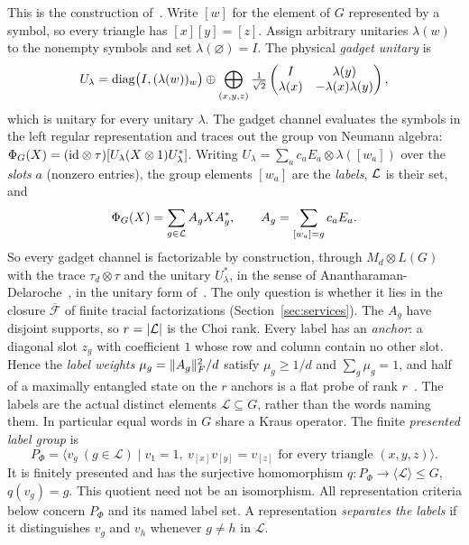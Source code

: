 This is the construction of~\cite[Section~9]{DouglasMghirbiC}.
Write $[w]$ for the element of $G$ represented by a symbol, so every
triangle has $[x][y]=[z]$. Assign arbitrary unitaries $\lambda(w)$
to the nonempty symbols and set $\lambda(\varnothing)=I$.
The physical \emph{gadget unitary} is
\begin{equation}\label{eq:canonical-unitary}
U_\lambda=\operatorname{diag}\bigl(I,(\lambda(w))_w\bigr)\oplus\bigoplus_{(x,y,z)}\tfrac1{\sqrt2}\begin{pmatrix}I&\lambda(y)\\\lambda(x)&-\lambda(x)\lambda(y)\end{pmatrix},
\end{equation}
which is unitary for every unitary $\lambda$. The gadget channel evaluates the symbols in the left regular representation and traces out the
group von Neumann algebra: $\Phi_G(X)=(\mathrm{id}\otimes\tau)[U_\lambda(X\otimes1)U_\lambda^*]$. Writing $U_\lambda=\sum_ac_aE_a\otimes\lambda([w_a])$ over the
\emph{slots} $a$ (nonzero entries), the group elements $[w_a]$ are the \emph{labels}, $\mathcal L$ is their set, and
\[
\Phi_G(X)=\sum_{g\in\mathcal L}A_gXA_g^*,\qquad A_g=\sum_{[w_a]=g}c_aE_a .
\]
So every gadget channel is factorizable by construction, through
$M_d\otimes L(G)$ with the trace $\tau_d\otimes\tau$ and the unitary
$U_\lambda^*$, in the sense of
Anantharaman-Delaroche~\cite{AnantharamanDelaroche2006}, in the unitary
form of~\cite[Theorem~2.2]{HaagerupMusat2011}.
The only question is whether it lies in the closure
$\overline{\mathcal F}$ of finite tracial factorizations
(Section~\ref{sec:services}).
The $A_g$ have disjoint supports, so $r=|\mathcal L|$ is the Choi rank. Every label has an \emph{anchor}: a diagonal slot $z_g$ with coefficient $1$
whose row and column contain no other slot. Hence the \emph{label weights} $\mu_g=\lVert A_g\rVert_F^2/d$ satisfy $\mu_g\ge1/d$ and
$\sum_g\mu_g=1$, and half of a maximally entangled state on the $r$ anchors is a flat probe of rank $r$~\cite[Section~9]{DouglasMghirbiC}.
The labels are the actual distinct elements $\mathcal L\subseteq G$,
rather than the words naming them. In particular equal words in $G$
share a Kraus operator. The finite \emph{presented label group} is
\[
 P_\Phi=\langle v_g\ (g\in\mathcal L)\mid v_1=1,\
 v_{[x]}v_{[y]}=v_{[z]}\text{ for every triangle }(x,y,z)\rangle .
\]
It is finitely presented and has the surjective homomorphism
$q:P_\Phi\to\langle\mathcal L\rangle\leq G$, $q(v_g)=g$.
This quotient need not be an isomorphism. All representation
criteria below concern $P_\Phi$ and its named label set.
A representation \emph{separates the labels} if it distinguishes
$v_g$ and $v_h$ whenever $g\ne h$ in $\mathcal L$.

